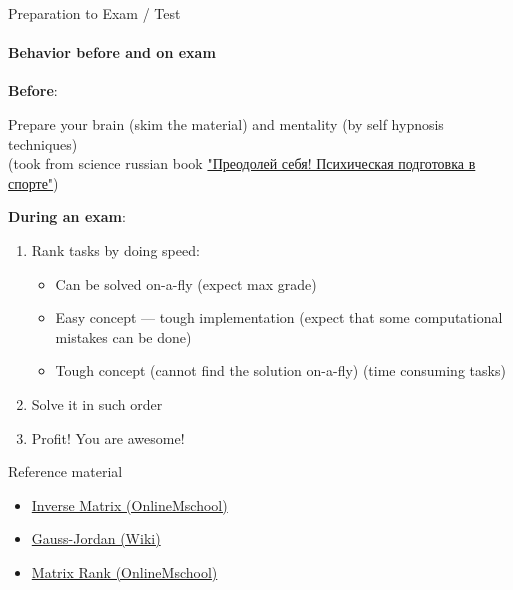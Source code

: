 \documentclass[aspectratio=169,notes]{beamer}
\newcommand{\fbckg}[1]{\usebackgroundtemplate{\texttt{[image: \#1]}}}%
\begin{document}
\begin{frame}[t]{Preparation to Exam / Test}
    \vspace{-0.5cm}
\framesubtitle{Behavior before and on exam}
\textbf{Before}:

Prepare your brain (skim the material) and mentality (by self hypnosis techniques) \\ (took from science russian book \href{https://yadi.sk/d/uZhNSQW637Q3v7}{"Преодолей себя! Психическая подготовка в спорте"}) \smallskip

\textbf{During an exam}:
\begin{enumerate}
    \item Rank tasks by doing speed: \begin{itemize}
        \item Can be solved on-a-fly (expect max grade)
        \item Easy concept --- tough implementation (expect that some computational mistakes can be done)
        \item Tough concept (cannot find the solution on-a-fly) (time consuming tasks)
    \end{itemize}
    \item Solve it in such order
    \item Profit! You are awesome!
\end{enumerate}

\end{frame}

\begin{frame}[t]{Reference material}
    \Large
    \begin{itemize}
        \item \href{https://onlinemschool.com/math/library/matrix/inverse/}{Inverse Matrix (OnlineMschool)}
        \item \href{https://en.wikipedia.org/wiki/Gaussian_elimination}{Gauss-Jordan (Wiki)}
        \item \href{https://onlinemschool.com/math/library/matrix/rank/}{Matrix Rank (OnlineMschool)}
    \end{itemize}
\end{frame}

\fbckg{fibeamer/figs/last_page.png}
\frame[plain]{}
\end{document}
